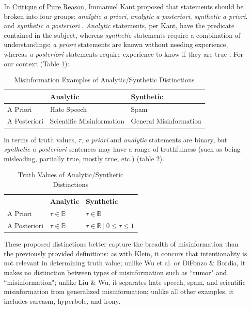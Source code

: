 \documentclass[preprint,review,12pt]{elsarticle}
\begin{document}
In \underline{Critique of Pure Reason}, Immanuel Kant proposed that statements should be broken into four groups: \textit{analytic a priori}, \textit{analytic a posteriori}, \textit{synthetic a priori}, and \textit{synthetic a posteriori} \cite{kant1908critique,frege1988collected,quine1951main}. \textit{Analytic} statements, per Kant, have the predicate contained in the subject, whereas \textit{synthetic} statements require a combination of understandings; \textit{a priori} statements are known without needing experience, whereas \textit{a posteriori} statements require experience to know if they are true \cite{wright1997companion}. For our context (Table \ref{tab:misinformationexamples}):
\begin{table}[htbp]
    \centering
    \begin{tabular}{ |p{3cm}|p{5cm}|p{5cm}|}
    \hline
    & Analytic & Synthetic\\
    \hline
    A Priori & Hate Speech & Spam\\
    \hline
    A Posteriori &  Scientific Misinformation  & General Misinformation\\
    \hline
    \end{tabular}
    \caption{Misinformation Examples of Analytic/Synthetic Distinctions}
    \label{tab:misinformationexamples}
\end{table}
in terms of truth values, $\tau$, \textit{a priori} and \textit{analytic} statements are binary, but \textit{synthetic a posteriori} sentences may have a range of truthfulness (such as being misleading, partially true, mostly true, etc.) (table \ref{tab:truthvalues}).

\begin{table}[h!]
\centering
\begin{tabular}{ |p{3cm}|p{5cm}|p{5cm}|}
 \hline
  & Analytic & Synthetic\\
 \hline
 A Priori & $\tau \in \mathbb{B}$ & $\tau \in \mathbb{B}$\\
 \hline
 A Posteriori &  $\tau \in \mathbb{B}$  & $\tau \in \mathbb{R} \ | \ 0 \leq \tau \leq 1$ \\
 \hline
\end{tabular}
\caption{Truth Values of Analytic/Synthetic Distinctions}
\label{tab:truthvalues}
\end{table}

These proposed distinctions better capture the breadth of misinformation than the previously provided definitions: as with Klein, it concurs that intentionality is not relevant in determining truth value; unlike Wu et al. or DiFonzo \& Bordia, it makes no distinction between types of misinformation such as ``rumor" and ``misinformation"; unlike Liu \& Wu, it separates hate speech, spam, and scientific misinformation from generalized misinformation; unlike all other examples, it includes sarcasm, hyperbole, and irony. 
\end{document}
